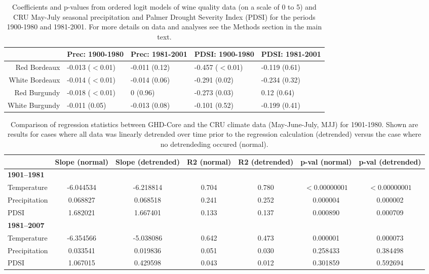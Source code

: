 \documentclass[12pt]{article}
\begin{document}
\begin{table}
\centering
\caption{Coefficients and p-values from  ordered logit models of wine quality data (on a scale of 0 to 5) and CRU May-July seasonal precipitation and Palmer Drought Severity Index (PDSI) for the periods 1900-1980 and 1981-2001. For more details on data and analyses see the Methods section in the main text.} 
\begin{tabular}{|r||l|l||l|l|}
  \hline
 & Prec: 1900-1980 & Prec: 1981-2001 & PDSI: 1900-1980 & PDSI: 1981-2001 \\ 
  \hline
Red Bordeaux & -0.013 ($<$0.01) & -0.011 (0.12) & -0.457 ($<$0.01) & -0.119 (0.61) \\ 
  White Bordeaux & -0.014 ($<$0.01) & -0.014 (0.06) & -0.291 (0.02) & -0.234 (0.32) \\ 
  Red Burgundy & -0.018 ($<$0.01) & 0 (0.96) & -0.273 (0.03) & 0.12 (0.64) \\ 
  White Burgundy & -0.011 (0.05) & -0.013 (0.08) & -0.101 (0.52) & -0.199 (0.41) \\ 
   \hline
\end{tabular}
\end{table}

\begin{table}
\small
\caption{\small Comparison of regression statistics between GHD-Core and the CRU climate data (May-June-July, MJJ) for 1901-1980. Shown are results for cases where all data was linearly detrended over time prior to the regression calculation (detrended) versus the case where no detrendeding occured (normal).}
\centering
\begin{tabular}{l c c c c c c}
\hline
& \bf Slope (normal) & \bf Slope (detrended) & \bf R2 (normal) & \bf R2 (detrended) & \bf p-val (normal) & \bf p-val (detrended)\\
\hline
\bf 1901--1981 & &  &  & & & \\
Temperature & -6.044534 & -6.218814	& 0.704 & 0.780 & $<0.00000001$ & $<0.00000001$\\
Precipitation & 0.068827  & 0.068518    & 0.241 & 0.252 & 0.000004 & 0.000002\\
PDSI & 1.682021  & 1.667401   & 0.133 & 0.137 & 0.000890 & 0.000709\\
\hline
\bf 1981--2007 & &  &  & & & \\
Temperature & -6.354566 & -5.038086	& 0.642	 & 0.473 & 0.000001 & 0.000073\\
Precipitation & 0.033541 & 0.019836  & 0.051 & 0.030 & 0.258433 & 0.384498\\
PDSI & 1.067015 & 0.429598   & 0.043	 & 0.012 & 0.301859 & 0.592694\\
\hline
\end{tabular}
\end{table}
\end{document}

